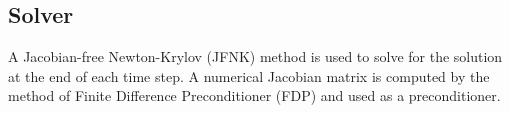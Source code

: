 \documentclass[preprint,10pt]{elsarticle}
\begin{document}
\subsection{Solver} \label{sec:solver}
%
A Jacobian-free Newton-Krylov (JFNK) method is used to solve for the solution at the end of each time step. A numerical Jacobian matrix is computed by the method of Finite Difference Preconditioner (FDP) and used as a preconditioner.
%
\end{document}
